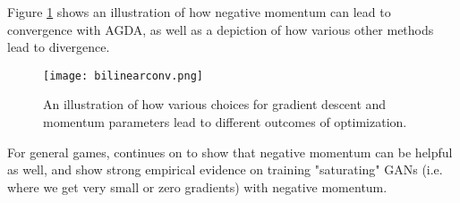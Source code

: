 \documentclass{article}
\begin{document}
Figure \ref{fig:bilinearconv} shows an illustration of how negative momentum can lead to convergence with AGDA, as well as a depiction of how various other methods lead to divergence. 

\begin{figure}[h!]
    \centering
    \texttt{[image: bilinearconv.png]}
    \label{fig:bilinearconv}
    \caption{An illustration of how various choices for gradient descent and momentum parameters lead to different outcomes of optimization.}
\end{figure}


For general games, \citet{Gidel18NegMom} continues on to show that negative momentum can be helpful as well, and show strong empirical evidence on training "saturating" GANs (i.e. where we get very small or zero gradients) with negative momentum.

 


\clearpage





\end{document}
